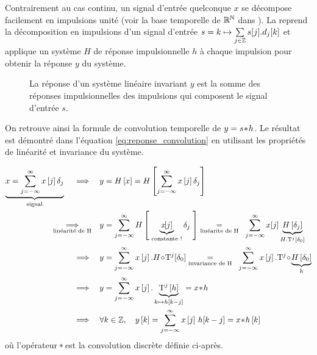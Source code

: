 Contrairement au cas continu, un signal d'entrée quelconque $x$ se
décompose facilement en impulsions unité (voir la base temporelle de
$\mathbb{R}^{\mathbb{N}}$ dans ). La 
reprend la décomposition en impulsions d'un signal d'entrée
$s=k\mapsto \sum\limits_{j\in\mathbb{Z}}^{}{s[j].d_j\!\left[k\right]}$ et applique un
système $H$ de réponse impulsionnelle $h$ à chaque impulsion pour
obtenir la réponse $y$ du système.

\begin{figure}[ht!]
  \centering {}
  \caption{La réponse d'un système linéaire invariant $y$ est la somme
    des réponses impulsionnelles des impulsions qui composent le
    signal d'entrée $s$.}
  \label{fig:reponse_convolution}
\end{figure}

On retrouve ainsi la formule de convolution temporelle de
$y=s\!\ast\! h$. Le résultat est démontré dans l'équation
\eqref{eq:reponse_convolution} en utilisant les propriétés de
linéarité et invariance du système.


\begin{align}
  \label{eq:reponse_convolution}
  \caCest{x = \somme{j=-\infty}{\infty}{x\b{j}\delta_{j}}}{\text{signal}}\quad \implies\quad &y=H\b{x}=H\b{\somme{j=-\infty}{\infty}{x\b{j}\delta_{j}}} \nonumber\\
  \underset{\text{linéarité de H}}{\implies}\quad &y=\somme{j=-\infty}{\infty}{H\b{ \;\caCest{x\!\!\b{j}}{\text{constante !}}\delta_{j}\;}} \underset{\text{linéarite de H}}{=} \;\;\somme{j=-\infty}{\infty}{x\!\b{j}\caCest{H\b{\delta_j}}{H.\oret^j\b{\delta_0}}} \nonumber \\
  \implies \quad &y=\somme{j=-\infty}{\infty}{x\b{j}.H\compo\oret^j\!\b{\delta_{0}}} \underset{\text{invariance de H}}{=} \;\;\somme{j=-\infty}{\infty}{x\b{j}.\oret^j\compo\caCest{H\b{\delta_{0}}}{h}}\nonumber\\
  \implies \quad & y= \somme{j=-\infty}{\infty}{x\b{j}.\caCest{\oret^j\b{h}}{k\mapsto h\b{k-j}}}=x\conv h \nonumber\\
  \implies \quad & \forall k\in\Z,\quad  y\b{k}= \somme{j=-\infty}{\infty}{x\b{j}\,h\!\b{k-j}} = x\conv h\b{k}
\end{align}
où l'opérateur $\!\ast\!$ est la convolution discrète définie ci-après.

